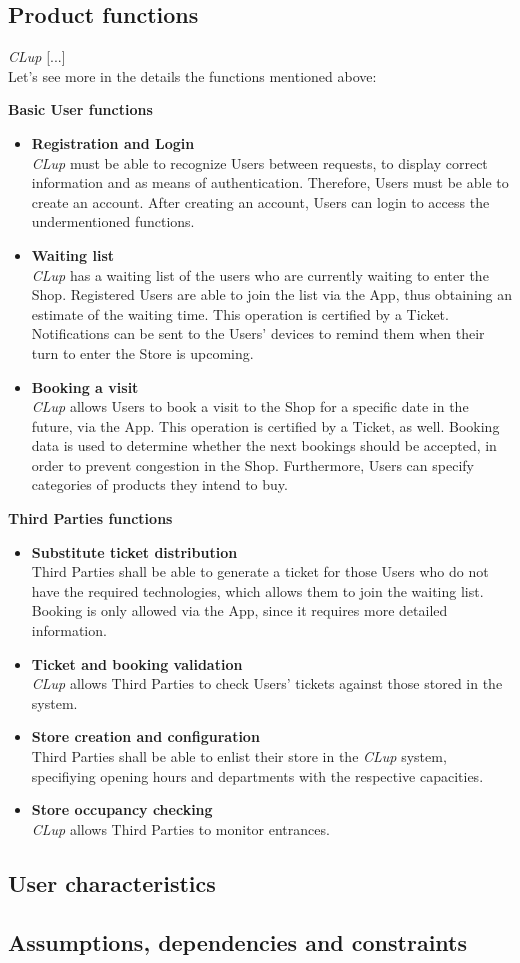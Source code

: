 \subsection{Product functions}
{
    \todo
    \noindent\emph{CLup} [...]
\\Let's see more in the details the functions mentioned above:
}

\textbf{Basic User functions}
\begin{itemize}
    \item \textbf{Registration and Login}\\
    \emph{CLup} must be able to recognize Users between requests, to display correct information and as means of authentication. Therefore, Users must be able to create an account. After creating an account, Users can login to access the undermentioned functions.
    \item \textbf{Waiting list}\\
    \emph{CLup} has a waiting list of the users who are currently waiting to enter the Shop. Registered Users are able to join the list via the App, thus obtaining an estimate of the waiting time. This operation is certified by a Ticket. Notifications can be sent to the Users' devices to remind them when their turn to enter the Store is upcoming.
    \item\textbf{Booking a visit}\\
    \emph{CLup} allows Users to book a visit to the Shop for a specific date in the future, via the App. This operation is certified by a Ticket, as well. Booking data is used to determine whether the next bookings should be accepted, in order to prevent congestion in the Shop.
    Furthermore, Users can specify categories of products they intend to buy.
    \end{itemize}  
    
    \textbf{Third Parties functions}
    
    \begin{itemize}
    
    \item\textbf{Substitute ticket distribution}\\
    Third Parties shall be able to generate a ticket for those Users who do not have the required technologies, which allows them to join the waiting list. Booking is only allowed via the App, since it requires more detailed information.
    \item\textbf{Ticket and booking validation}\\
    \emph{CLup} allows Third Parties to check Users' tickets against those stored in the system.
    \item\textbf{Store creation and configuration}\\
    Third Parties shall be able to enlist their store in the \emph{CLup} system, specifiying opening hours and departments with the respective capacities.
    \item\textbf{Store occupancy checking}\\
    \emph{CLup} allows Third Parties to monitor entrances.
\end{itemize}
\subsection{User characteristics}
\subsection{Assumptions, dependencies and constraints}

